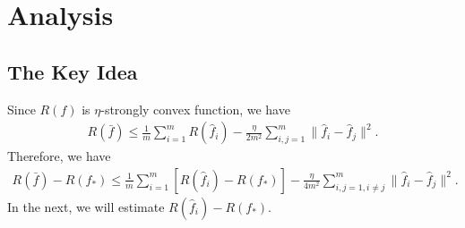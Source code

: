 \documentclass{article}
\begin{document}
\section{Analysis}
\subsection{The Key Idea}
Since $R(f)$ is $\eta$-strongly convex function,
we have
\begin{align*}
  R(\bar{f})\leq \frac{1}{m}\sum_{i=1}^mR(\hat{f}_i)-\frac{\eta}{2m^2}\sum_{i,j=1}^m\|\hat{f}_i-\hat{f}_j\|^2.
\end{align*}
Therefore, we have
\begin{align}
\label{equaiton-strongly-ff}
  R(\bar{f})-R(f_\ast)\leq \frac{1}{m}\sum_{i=1}^m\left[R(\hat{f}_i)-R(f_\ast)\right]
  -\frac{\eta}{4m^2}\sum_{i,j=1,i\not=j}^m\|\hat{f}_i-\hat{f}_j\|^2.
\end{align}
In the next, we will estimate $R(\hat{f}_i)-R(f_\ast)$.
\end{document}
